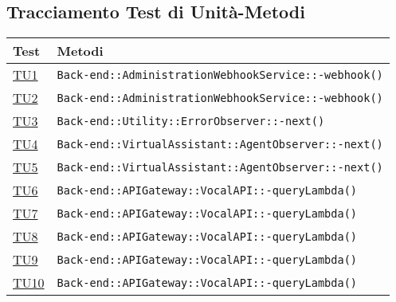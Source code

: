 \subsection{Tracciamento Test di Unità-Metodi}
\normalsize
\begin{longtable}{|>{\centering}m{1cm}|m{12cm}<{\centering}|}
\hline 
\textbf{Test} & \textbf{Metodi}\\
\hline
\endhead
\hyperlink{TU1}{TU1} & \texttt{Back-end::AdministrationWebhookService::-\linebreak webhook()}\\ \hline

\hyperlink{TU2}{TU2} & \texttt{Back-end::AdministrationWebhookService::-\linebreak webhook()}\\ \hline

\hyperlink{TU3}{TU3} & \texttt{Back-end::Utility::ErrorObserver::-\linebreak next()}\\ \hline

\hyperlink{TU4}{TU4} & \texttt{Back-end::VirtualAssistant::AgentObserver::-\linebreak next()}\\ \hline

\hyperlink{TU5}{TU5} & \texttt{Back-end::VirtualAssistant::AgentObserver::-\linebreak next()}\\ \hline

\hyperlink{TU6}{TU6} & \texttt{Back-end::APIGateway::VocalAPI::-\linebreak queryLambda()}\\ \hline

\hyperlink{TU7}{TU7} & \texttt{Back-end::APIGateway::VocalAPI::-\linebreak queryLambda()}\\ \hline

\hyperlink{TU8}{TU8} & \texttt{Back-end::APIGateway::VocalAPI::-\linebreak queryLambda()}\\ \hline

\hyperlink{TU9}{TU9} & \texttt{Back-end::APIGateway::VocalAPI::-\linebreak queryLambda()}\\ \hline

\hyperlink{TU10}{TU10} & \texttt{Back-end::APIGateway::VocalAPI::-\linebreak queryLambda()}\\ \hline


\end{longtable}
